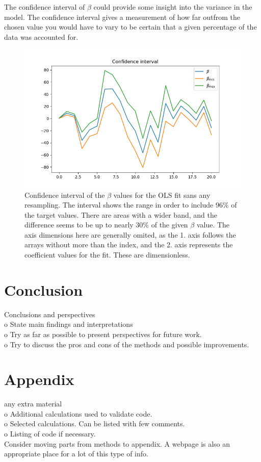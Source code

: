 \documentclass[ 12pt, a4paper ]{article}
\begin{document}
The confidence interval of $\beta$ could provide some insight into the variance in the model. 
The confidence interval gives a measurement of how far outfrom the chosen value you would have 
to vary to be certain that a given percentage of the data was accounted for. 

\begin{figure}
\includegraphics[scale=0.7]{frankeci.png}
\caption{
    Confidence interval of the $\beta$ values for the OLS fit sans any resampling. 
    The interval shows the range in order to include 96\% of the target values. There are 
    areas with a wider band, and the difference seems to be up to nearly 30\% of the given 
    $\beta$ value. The axis dimensions here are generally omited, as the 1. axis follows the 
    arrays without more than the index, and the 2. axis represents the coefficient values for
    the fit. These are dimensionless. 
}
\end{figure}

\section{Conclusion}
    Conclusions and perspectives\\
    o   State main findings and interpretations \\
    o   Try as far as possible to present perspectives for future work. \\
    o   Try to discuss the pros and cons of the methods and possible improvements. \\
\section{Appendix}
    any extra material \\
    o   Additional calculations used to validate code. \\
    o   Selected calculations. Can be listed with few comments. \\
    o   Listing of code if necessary. \\
    Consider moving parts from methods to appendix. A webpage is also an appropriate place
    for a lot of this type of info. \\\\
\end{document}
